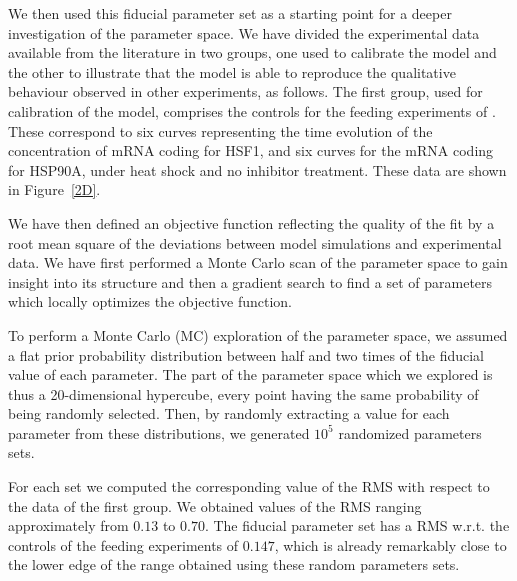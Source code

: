 \documentclass[oneside, 10pt, a4paper, twocolumn]{article}
\begin{document}
We then used this fiducial parameter set as a starting point for a
deeper investigation of the parameter space. We have divided the experimental data available from the literature in two
groups, one used to calibrate the model and the other to illustrate
that the model is able to reproduce the qualitative behaviour observed
in other experiments, as follows. The first group, used for calibration
of the model, comprises the controls for the feeding
experiments of \cite{Schmollinger2013}. These correspond to six curves
representing the time evolution of the concentration of mRNA coding
for HSF1, and six curves for the mRNA coding for HSP90A, under heat
shock and no inhibitor treatment. These data are shown in Figure~\ref{2D}.

We have then defined an objective function reflecting the quality of the fit by
a root mean square of the deviations between model simulations and experimental 
data. We have first performed a
Monte Carlo scan of the parameter space to gain insight into its
structure and then a gradient search to find a set of parameters which
locally optimizes the objective function. 

To perform a Monte Carlo (MC) exploration of the parameter space, we assumed a flat prior probability distribution between half and two times of the fiducial value of each parameter. The part of the parameter space which we explored is thus a 20-dimensional hypercube, every point having the same probability of being randomly selected.
Then, by randomly extracting a value for each parameter from these distributions, we generated $10^5$ randomized parameters sets.

For each set we computed the corresponding value of the RMS with respect to the data of the first group. We obtained values of the RMS ranging approximately from $0.13$ to $0.70$. 
The fiducial parameter set has a RMS w.r.t. the controls of the feeding experiments of $0.147$, which is already remarkably close to the lower edge of the range obtained using these random parameters sets. 
\end{document}
